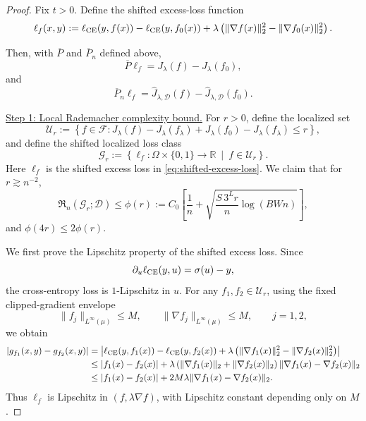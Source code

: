 \documentclass[11pt]{article}
\theoremstyle{plain}
\theoremstyle{definition}
\theoremstyle{remark}
\newcommand{\proofstep}[1]{\par\medskip\noindent\uline{#1}}
\begin{document}
\begin{proof}
Fix \(t>0\).
Define the shifted excess-loss function
\begin{equation}
\label{eq:shifted-excess-loss}
\ell_f(x,y):=
\ell_{\rm CE}(y,f(x))
-
\ell_{\rm CE}(y,f_0(x))
+
\lambda
\left(
\|\nabla f(x)\|_2^2
-
\|\nabla f_0(x)\|_2^2
\right).
\end{equation}

Then, with \(\overline P\) and \(\overline P_n\) defined above,
\[
\overline P\ell_f
=
J_\lambda(f)-J_\lambda(f_0),
\]
and
\[
\overline P_n\ell_f
=
\widehat J_{\lambda,\mathcal D}(f)
-
\widehat J_{\lambda,\mathcal D}(f_0).
\]


\proofstep{Step 1: Local Rademacher complexity bound.}
For \(r>0\), define the localized set
\[
\mathcal U_r:=
\left\{
f\in\mathcal F:
J_\lambda(f)-J_\lambda(f_\lambda)
+
J_\lambda(f_0)-J_\lambda(f_\lambda)
\le r
\right\},
\]
and define the shifted localized loss class
\[
\mathcal G_r:=
\left\{
\ell_f:\Omega\times\{0,1\}\to\mathbb R
\ \middle|\
f\in \mathcal U_r
\right\}.
\]
Here \(\ell_f\) is the shifted excess loss in
\eqref{eq:shifted-excess-loss}.
We claim that for \(r\gtrsim n^{-2}\),
\begin{equation}
\label{eq:shifted-local-rad}
\mathfrak R_n(\mathcal G_r;\mathcal D)
\le
\phi(r):=
C_0\left[
\frac{1}{n}
+
\sqrt{
\frac{S\,3^L r}{n}\log(BWn)
}
\right],
\end{equation}
and \(\phi(4r)\le2\phi(r)\).

We first prove the Lipschitz property of the shifted excess loss. Since
\[
\partial_u\ell_{\rm CE}(y,u)=\sigma(u)-y,
\]
the cross-entropy loss is \(1\)-Lipschitz in \(u\). For any
\(f_1,f_2\in \mathcal U_r\), using the fixed clipped-gradient
envelope
\[
\|f_j\|_{L^\infty(\mu)}\le M,\qquad
\|\nabla f_j\|_{L^\infty(\mu)}\le M,
\qquad j=1,2,
\]
we obtain
\[
\begin{aligned}
|g_{f_1}(x,y)-g_{f_2}(x,y)|
&=
\left|
\ell_{\rm CE}(y,f_1(x))
-
\ell_{\rm CE}(y,f_2(x))
+
\lambda\left(
\|\nabla f_1(x)\|_2^2
-
\|\nabla f_2(x)\|_2^2
\right)
\right|\\
&\le
|f_1(x)-f_2(x)|
+
\lambda
\left(
\|\nabla f_1(x)\|_2+\|\nabla f_2(x)\|_2
\right)
\|\nabla f_1(x)-\nabla f_2(x)\|_2\\
&\le
|f_1(x)-f_2(x)|
+
2M\lambda
\|\nabla f_1(x)-\nabla f_2(x)\|_2.
\end{aligned}
\]
Thus \(\ell_f\) is Lipschitz in \((f,\lambda\nabla f)\), with Lipschitz constant
depending only on \(M\).


\end{proof}
\end{document}
